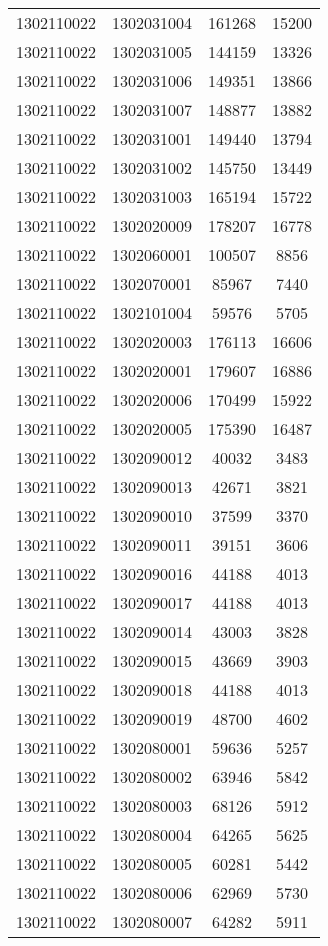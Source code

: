 \begin{longtable}{llcc}
1302110022 & 1302031004 & 161268 & 15200\\
1302110022 & 1302031005 & 144159 & 13326\\
1302110022 & 1302031006 & 149351 & 13866\\
1302110022 & 1302031007 & 148877 & 13882\\
1302110022 & 1302031001 & 149440 & 13794\\
1302110022 & 1302031002 & 145750 & 13449\\
1302110022 & 1302031003 & 165194 & 15722\\
1302110022 & 1302020009 & 178207 & 16778\\
1302110022 & 1302060001 & 100507 & 8856\\
1302110022 & 1302070001 & 85967 & 7440\\
1302110022 & 1302101004 & 59576 & 5705\\
1302110022 & 1302020003 & 176113 & 16606\\
1302110022 & 1302020001 & 179607 & 16886\\
1302110022 & 1302020006 & 170499 & 15922\\
1302110022 & 1302020005 & 175390 & 16487\\
1302110022 & 1302090012 & 40032 & 3483\\
1302110022 & 1302090013 & 42671 & 3821\\
1302110022 & 1302090010 & 37599 & 3370\\
1302110022 & 1302090011 & 39151 & 3606\\
1302110022 & 1302090016 & 44188 & 4013\\
1302110022 & 1302090017 & 44188 & 4013\\
1302110022 & 1302090014 & 43003 & 3828\\
1302110022 & 1302090015 & 43669 & 3903\\
1302110022 & 1302090018 & 44188 & 4013\\
1302110022 & 1302090019 & 48700 & 4602\\
1302110022 & 1302080001 & 59636 & 5257\\
1302110022 & 1302080002 & 63946 & 5842\\
1302110022 & 1302080003 & 68126 & 5912\\
1302110022 & 1302080004 & 64265 & 5625\\
1302110022 & 1302080005 & 60281 & 5442\\
1302110022 & 1302080006 & 62969 & 5730\\
1302110022 & 1302080007 & 64282 & 5911\\

\end{longtable}
